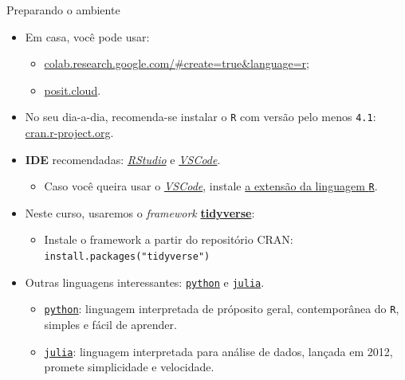 \documentclass[
  10pt,
  ignorenonframetext,
]{beamer}
\providecommand{\tightlist}{%
  \setlength{\itemsep}{0pt}\setlength{\parskip}{0pt}}\usepackage{longtable,booktabs,array}
\begin{document}
\begin{frame}[fragile]{Preparando o ambiente}
\protect\hypertarget{preparando-o-ambiente}{}
\begin{itemize}
\tightlist
\item
  Em casa, você pode usar:

  \begin{itemize}
  \tightlist
  \item
    \href{https://colab.research.google.com/\#create=true\&language=r}{colab.research.google.com/\#create=true\&language=r};
  \item
    \href{https://posit.cloud}{posit.cloud}.
  \end{itemize}
\item
  No seu dia-a-dia, recomenda-se instalar o \texttt{R} com versão pelo
  menos \texttt{4.1}:
  \href{https://cran.r-project.org}{cran.r-project.org}.
\item
  \textbf{IDE} recomendadas:
  \href{https://posit.co/downloads/}{\emph{RStudio}} e
  \href{https://code.visualstudio.com}{\emph{VSCode}}.

  \begin{itemize}
  \tightlist
  \item
    Caso você queira usar o
    \href{https://code.visualstudio.com}{\emph{VSCode}}, instale
    \href{https://code.visualstudio.com/docs/languages/r}{a extensão da
    linguagem \texttt{R}}.
  \end{itemize}
\item
  Neste curso, usaremos o \emph{framework}
  \href{https://www.tidyverse.org}{\textbf{tidyverse}}:

  \begin{itemize}
  \tightlist
  \item
    Instale o framework a partir do repositório CRAN:
    \texttt{install.packages("tidyverse")}
  \end{itemize}
\item
  Outras linguagens interessantes:
  \href{https://www.python.org}{\texttt{python}} e
  \href{https://julialang.org}{\texttt{julia}}.

  \begin{itemize}
  \tightlist
  \item
    \href{https://www.python.org}{\texttt{python}}: linguagem
    interpretada de próposito geral, contemporânea do \texttt{R},
    simples e fácil de aprender.
  \item
    \href{https://julialang.org}{\texttt{julia}}: linguagem interpretada
    para análise de dados, lançada em 2012, promete simplicidade e
    velocidade.
  \end{itemize}
\end{itemize}
\end{frame}
\end{document}
